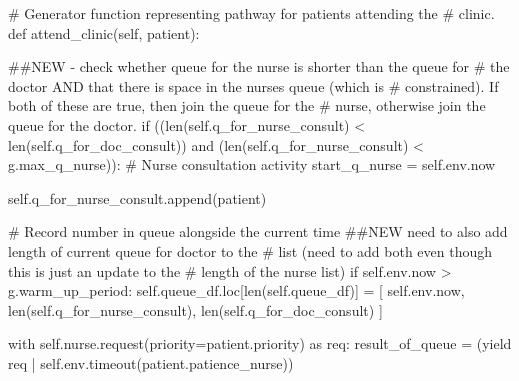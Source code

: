 \documentclass[
  letterpaper,
  DIV=11,
  numbers=noendperiod]{scrreprt}
\newenvironment{Shaded}{}{}
\newcommand{\BuiltInTok}[1]{\textcolor[rgb]{0.84,0.23,0.29}{#1}}
\newcommand{\CommentTok}[1]{\textcolor[rgb]{0.42,0.45,0.49}{#1}}
\newcommand{\ControlFlowTok}[1]{\textcolor[rgb]{0.84,0.23,0.29}{#1}}
\newcommand{\ImportTok}[1]{\textcolor[rgb]{0.01,0.18,0.38}{#1}}
\newcommand{\KeywordTok}[1]{\textcolor[rgb]{0.84,0.23,0.29}{#1}}
\newcommand{\NormalTok}[1]{\textcolor[rgb]{0.14,0.16,0.18}{#1}}
\newcommand{\OperatorTok}[1]{\textcolor[rgb]{0.14,0.16,0.18}{#1}}
\newcommand{\VariableTok}[1]{\textcolor[rgb]{0.89,0.38,0.04}{#1}}
\begin{document}
\begin{tcolorbox}
\begin{Shaded}
\begin{Highlighting}[]
    \CommentTok{\# Generator function representing pathway for patients attending the}
    \CommentTok{\# clinic.}
    \KeywordTok{def}\NormalTok{ attend\_clinic(}\VariableTok{self}\NormalTok{, patient):}

        \CommentTok{\#\#NEW {-} check whether queue for the nurse is shorter than the queue for}
        \CommentTok{\# the doctor AND that there is space in the nurse\textquotesingle{}s queue (which is}
        \CommentTok{\# constrained).  If both of these are true, then join the queue for the}
        \CommentTok{\# nurse, otherwise join the queue for the doctor.}
        \ControlFlowTok{if}\NormalTok{ ((}\BuiltInTok{len}\NormalTok{(}\VariableTok{self}\NormalTok{.q\_for\_nurse\_consult) }\OperatorTok{\textless{}} \BuiltInTok{len}\NormalTok{(}\VariableTok{self}\NormalTok{.q\_for\_doc\_consult)) }\KeywordTok{and}
\NormalTok{            (}\BuiltInTok{len}\NormalTok{(}\VariableTok{self}\NormalTok{.q\_for\_nurse\_consult) }\OperatorTok{\textless{}}\NormalTok{ g.max\_q\_nurse)):}
            \CommentTok{\# Nurse consultation activity}
\NormalTok{            start\_q\_nurse }\OperatorTok{=} \VariableTok{self}\NormalTok{.env.now}

            \VariableTok{self}\NormalTok{.q\_for\_nurse\_consult.append(patient)}

            \CommentTok{\# Record number in queue alongside the current time}
            \CommentTok{\#\#NEW need to also add length of current queue for doctor to the}
            \CommentTok{\# list (need to add both even though this is just an update to the}
            \CommentTok{\# length of the nurse list)}
            \ControlFlowTok{if} \VariableTok{self}\NormalTok{.env.now }\OperatorTok{\textgreater{}}\NormalTok{ g.warm\_up\_period:}
                \VariableTok{self}\NormalTok{.queue\_df.loc[}\BuiltInTok{len}\NormalTok{(}\VariableTok{self}\NormalTok{.queue\_df)] }\OperatorTok{=}\NormalTok{ [}
                    \VariableTok{self}\NormalTok{.env.now,}
                    \BuiltInTok{len}\NormalTok{(}\VariableTok{self}\NormalTok{.q\_for\_nurse\_consult),}
                    \BuiltInTok{len}\NormalTok{(}\VariableTok{self}\NormalTok{.q\_for\_doc\_consult)}
\NormalTok{                ]}

            \ControlFlowTok{with} \VariableTok{self}\NormalTok{.nurse.request(priority}\OperatorTok{=}\NormalTok{patient.priority) }\ImportTok{as}\NormalTok{ req:}
\NormalTok{                result\_of\_queue }\OperatorTok{=}\NormalTok{ (}\ControlFlowTok{yield}\NormalTok{ req }\OperatorTok{|}
                                \VariableTok{self}\NormalTok{.env.timeout(patient.patience\_nurse))}


\end{Highlighting}
\end{Shaded}
\end{tcolorbox}
\end{document}
